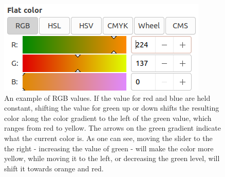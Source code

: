 \begin{figure}[H]
\centering
\includegraphics[width=0.6\linewidth]{figures/rgb-1}
\caption[An Example of RGB Color Values]{An example of RGB values.  If the value for red and blue are held constant, shifting the value for green up or down shifts the resulting color along the color gradient to the left of the green value, which ranges from red to yellow.  The arrows on the green gradient indicate what the current color is.  As one can see, moving the slider to the the right - increasing the value of green - will make the color more yellow, while moving it to the left, or decreasing the green level, will shift it towards orange and red.}
\label{fig:rgb-1}
\end{figure}